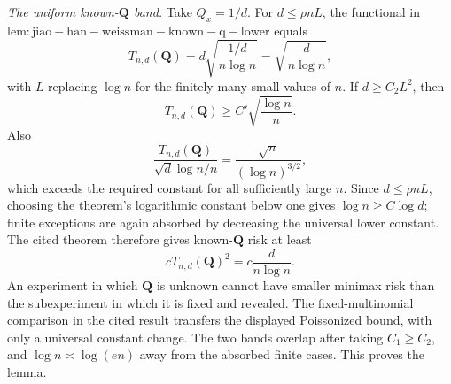 \emph{The uniform known-\(\mathbf Q\) band.}
Take \(Q_x=1/d\).  For \(d\le\rho nL\), the functional in \(\mathrm{lem:jiao-han-weissman-known-q-lower}\) equals
\[
 T_{n,d}(\mathbf Q)
 =d\sqrt{\frac{1/d}{n\log n}}
 =\sqrt{\frac d{n\log n}},
\]
with \(L\) replacing \(\log n\) for the finitely many small values of \(n\).  If \(d\ge C_2L^2\), then
\[
 T_{n,d}(\mathbf Q)
 \ge C'\sqrt{\frac{\log n}{n}}.
\]
Also
\[
 \frac{T_{n,d}(\mathbf Q)}{\sqrt d\log n/n}
 =\frac{\sqrt n}{(\log n)^{3/2}},
\]
which exceeds the required constant for all sufficiently large \(n\).  Since \(d\le\rho nL\), choosing the theorem's logarithmic constant below one gives \(\log n\ge C\log d\); finite exceptions are again absorbed by decreasing the universal lower constant.  The cited theorem therefore gives known-\(\mathbf Q\) risk at least
\[
 cT_{n,d}(\mathbf Q)^2
 =c\frac d{n\log n}.
\]
An experiment in which \(\mathbf Q\) is unknown cannot have smaller minimax risk than the subexperiment in which it is fixed and revealed.  The fixed-multinomial comparison in the cited result transfers the displayed Poissonized bound, with only a universal constant change.  The two bands overlap after taking \(C_1\ge C_2\), and \(\log n\asymp\log(en)\) away from the absorbed finite cases.  This proves the lemma.